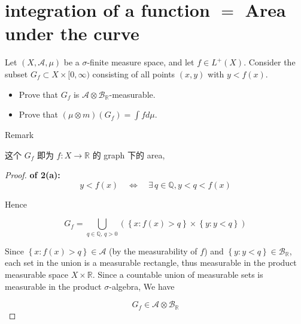 \section{\texorpdfstring{integration of a function \(=\) Area under the curve}{integration of a function = Area under the curve}}\label{integration-of-a-function-area-under-the-curve}

Let \((X,\mathcal{A},\mu)\) be a \(\sigma\)-finite measure space, and let \(f \in L^{+}(X)\). Consider the subset \(G_{f} \subset X \times \lbrack 0,\infty)\) consisting of all points \((x,y)\) with \(y < f(x)\).

\begin{itemize}
\item
  Prove that \(G_{f}\) is \(\mathcal{A} \otimes \mathcal{B}_{\mathbb{R}}\)-measurable.
\item
  Prove that \((\mu \otimes m)(G_{f}) = \int f d\mu\).
\end{itemize}

\begin{qlremark}{Remark}

这个 \(G_{f}\) 即为 \(f:X\rightarrow\mathbb{R}\) 的 graph 下的 area,

\end{qlremark}

\begin{proof}

\textbf{of 2(a):}\\

\[y < f(x)\quad\Leftrightarrow\quad\exists\, q \in \mathbb{Q}, y < q < f(x)\]

Hence

\[G_{f} = \bigcup\limits_{q \in \mathbb{Q},\, q > 0}(\left\{ {x:f(x) > q} \right\} \times \left\{ {y:y < q} \right\})\]

Since \(\left\{ {x:f(x) > q} \right\} \in \mathcal{A}\) (by the measurability of \(f\)) and \(\left\{ {y:y < q} \right\} \in \mathcal{B}_{\mathbb{R}}\), each set in the union is a measurable rectangle, thus measurable in the product measurable space \(X \times \mathbb{R}\). Since a countable union of measurable sets is measurable in the product \(\sigma\)-algebra, We have

\[G_{f} \in \mathcal{A} \otimes \mathcal{B}_{\mathbb{R}}\]

\end{proof}

